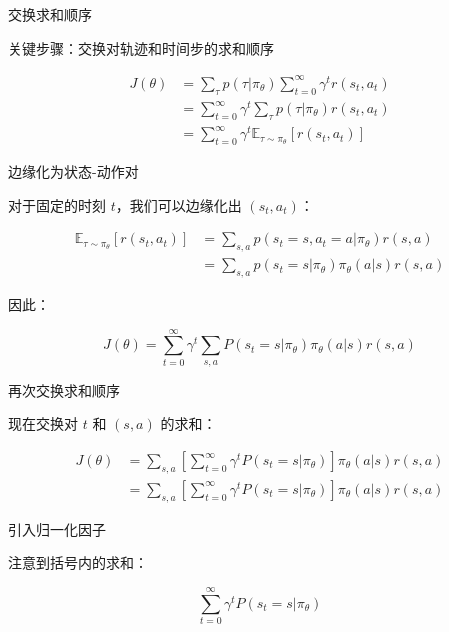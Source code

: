 \documentclass[lang=cn,newtx,10pt,scheme=chinese]{elegantbook}
\begin{document}
交换求和顺序

关键步骤：交换对轨迹和时间步的求和顺序

\begin{equation}
\begin{aligned}
J(\theta) &= \sum_{\tau} p(\tau | \pi_\theta) \sum_{t=0}^{\infty} \gamma^t r(s_t, a_t) \\
&= \sum_{t=0}^{\infty} \gamma^t \sum_{\tau} p(\tau | \pi_\theta) r(s_t, a_t) \\
&= \sum_{t=0}^{\infty} \gamma^t \mathbb{E}_{\tau \sim \pi_\theta} [r(s_t, a_t)]
\end{aligned}
\end{equation}

边缘化为状态-动作对

对于固定的时刻 $t$，我们可以边缘化出 $(s_t, a_t)$：

\begin{equation}
\begin{aligned}
\mathbb{E}_{\tau \sim \pi_\theta} [r(s_t, a_t)] &= \sum_{s,a} p(s_t=s, a_t=a | \pi_\theta) r(s,a) \\
&= \sum_{s,a} p(s_t=s | \pi_\theta) \pi_\theta(a|s) r(s,a)
\end{aligned}
\end{equation}

因此：

\begin{equation}
J(\theta) = \sum_{t=0}^{\infty} \gamma^t \sum_{s,a} P(s_t=s | \pi_\theta) \pi_\theta(a|s) r(s,a)
\end{equation}

再次交换求和顺序

现在交换对 $t$ 和 $(s,a)$ 的求和：

\begin{equation}
\begin{aligned}
J(\theta) &= \sum_{s,a} \left[ \sum_{t=0}^{\infty} \gamma^t P(s_t=s | \pi_\theta) \right] \pi_\theta(a|s) r(s,a) \\
&= \sum_{s,a} \left[ \sum_{t=0}^{\infty} \gamma^t P(s_t=s | \pi_\theta) \right] \pi_\theta(a|s) r(s,a)
\end{aligned}
\end{equation}

引入归一化因子

注意到括号内的求和：

\begin{equation}
\sum_{t=0}^{\infty} \gamma^t P(s_t=s | \pi_\theta)
\end{equation}
\end{document}
